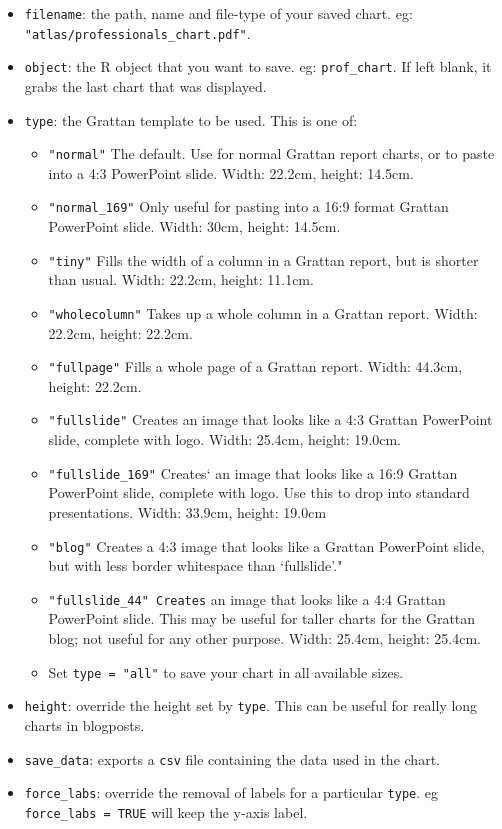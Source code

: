 \documentclass[]{book}
\providecommand{\tightlist}{%
  \setlength{\itemsep}{0pt}\setlength{\parskip}{0pt}}
\begin{document}
\begin{itemize}
\tightlist
\item
  \texttt{filename}: the path, name and file-type of your saved chart. eg: \texttt{"atlas/professionals\_chart.pdf"}.
\item
  \texttt{object}: the R object that you want to save. eg: \texttt{prof\_chart}. If left blank, it grabs the last chart that was displayed.
\item
  \texttt{type}: the Grattan template to be used. This is one of:

  \begin{itemize}
  \tightlist
  \item
    \texttt{"normal"} The default. Use for normal Grattan report charts, or to paste into a 4:3 PowerPoint slide. Width: 22.2cm, height: 14.5cm.
  \item
    \texttt{"normal\_169"} Only useful for pasting into a 16:9 format Grattan PowerPoint slide. Width: 30cm, height: 14.5cm.
  \item
    \texttt{"tiny"} Fills the width of a column in a Grattan report, but is shorter than usual. Width: 22.2cm, height: 11.1cm.
  \item
    \texttt{"wholecolumn"} Takes up a whole column in a Grattan report. Width: 22.2cm, height: 22.2cm.
  \item
    \texttt{"fullpage"} Fills a whole page of a Grattan report. Width: 44.3cm, height: 22.2cm.
  \item
    \texttt{"fullslide"} Creates an image that looks like a 4:3 Grattan PowerPoint slide, complete with logo. Width: 25.4cm, height: 19.0cm.
  \item
    \texttt{"fullslide\_169"} Creates` an image that looks like a 16:9 Grattan PowerPoint slide, complete with logo. Use this to drop into standard presentations. Width: 33.9cm, height: 19.0cm
  \item
    \texttt{"blog"} Creates a 4:3 image that looks like a Grattan PowerPoint slide, but with less border whitespace than `fullslide'."
  \item
    \texttt{"fullslide\_44"\ Creates} an image that looks like a 4:4 Grattan PowerPoint slide. This may be useful for taller charts for the Grattan blog; not useful for any other purpose. Width: 25.4cm, height: 25.4cm.
  \item
    Set \texttt{type\ =\ "all"} to save your chart in all available sizes.
  \end{itemize}
\item
  \texttt{height}: override the height set by \texttt{type}. This can be useful for really long charts in blogposts.
\item
  \texttt{save\_data}: exports a \texttt{csv} file containing the data used in the chart.
\item
  \texttt{force\_labs}: override the removal of labels for a particular \texttt{type}. eg \texttt{force\_labs\ =\ TRUE} will keep the y-axis label.
\end{itemize}
\end{document}
